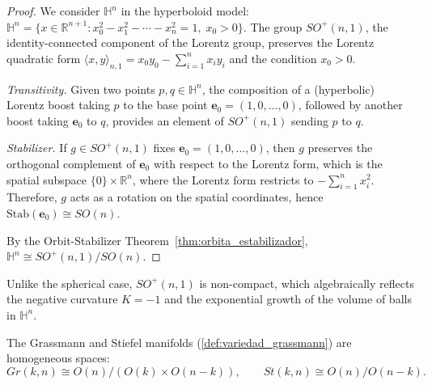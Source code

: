 \begin{proof}
We consider $\mathbb{H}^n$ in the hyperboloid model: $\mathbb{H}^n = \{x \in \mathbb{R}^{n+1} : x_0^2 - x_1^2 - \cdots - x_n^2 = 1, \; x_0 > 0\}$. The group $SO^+(n,1)$, the identity-connected component of the Lorentz group, preserves the Lorentz quadratic form $\langle x, y \rangle_{n,1} = x_0 y_0 - \sum_{i=1}^n x_i y_i$ and the condition $x_0 > 0$.

\textit{Transitivity.} Given two points $p, q \in \mathbb{H}^n$, the composition of a (hyperbolic) Lorentz boost taking $p$ to the base point $\mathbf{e}_0 = (1,0,\ldots,0)$, followed by another boost taking $\mathbf{e}_0$ to $q$, provides an element of $SO^+(n,1)$ sending $p$ to $q$.

\textit{Stabilizer.} If $g \in SO^+(n,1)$ fixes $\mathbf{e}_0 = (1,0,\ldots,0)$, then $g$ preserves the orthogonal complement of $\mathbf{e}_0$ with respect to the Lorentz form, which is the spatial subspace $\{0\} \times \mathbb{R}^n$, where the Lorentz form restricts to $-\sum_{i=1}^n x_i^2$. Therefore, $g$ acts as a rotation on the spatial coordinates, hence $\mathrm{Stab}(\mathbf{e}_0) \cong SO(n)$.

By the Orbit-Stabilizer Theorem~\ref{thm:orbita_estabilizador}, $\mathbb{H}^n \cong SO^+(n,1)/SO(n)$.
\end{proof}

Unlike the spherical case, $SO^+(n,1)$ is non-compact, which algebraically reflects the negative curvature $K=-1$ and the exponential growth of the volume of balls in $\mathbb{H}^n$.

\begin{proposition}\label{prop:grassmann_stiefel_cociente}
The Grassmann and Stiefel manifolds (\autoref{def:variedad_grassmann}) are homogeneous spaces:
\[
Gr(k,n) \cong O(n)/(O(k) \times O(n-k)), \qquad St(k,n) \cong O(n)/O(n-k).
\]
\end{proposition}

